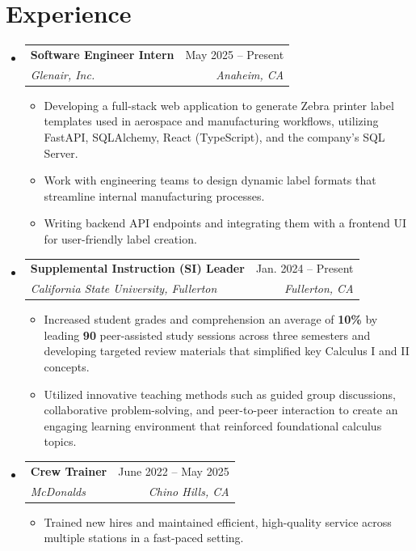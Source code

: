 \documentclass[letterpaper,11pt]{article}
\makeatletter
\newcommand{\resumeItem}[1]{
  \item\small{
    {#1 \vspace{-2pt}}
  }
}
\newcommand{\resumeSubheading}[4]{
  \vspace{-2pt}\item
    \begin{tabular*}{0.97\textwidth}[t]{l@{\extracolsep{\fill}}r}
      \textbf{#1} & #2 \\
      \textit{\small#3} & \textit{\small #4} \\
    \end{tabular*}\vspace{-7pt}
}
\newcommand{\resumeSubSubheading}[2]{
    \item
    \begin{tabular*}{0.97\textwidth}{l@{\extracolsep{\fill}}r}
      \textit{\small#1} & \textit{\small #2} \\
    \end{tabular*}\vspace{-7pt}
}
\newcommand{\resumeSubHeadingListStart}{\begin{itemize}[leftmargin=0.15in, label={}]}
\newcommand{\resumeSubHeadingListEnd}{\end{itemize}}
\newcommand{\resumeItemListStart}{\begin{itemize}}
\newcommand{\resumeItemListEnd}{\end{itemize}\vspace{-5pt}}
\makeatother
\begin{document}
\section{Experience}
  \resumeSubHeadingListStart
    \resumeSubheading
      {Software Engineer Intern}{May 2025 -- Present}
      {Glenair, Inc.}{Anaheim, CA}
      \resumeItemListStart
        \resumeItem{Developing a full-stack web application to generate Zebra printer label templates used in aerospace and manufacturing workflows, utilizing FastAPI, SQLAlchemy, React (TypeScript), and the company’s SQL Server.}
        \resumeItem{Work with engineering teams to design dynamic label formats that streamline internal manufacturing processes.}
        \resumeItem{Writing backend API endpoints and integrating them with a frontend UI for user-friendly label creation.}
      \resumeItemListEnd
      

    \resumeSubheading
      {Supplemental Instruction (SI) Leader}{Jan. 2024 -- Present}
      {California State University, Fullerton}{Fullerton, CA}
      \resumeItemListStart
        \resumeItem{Increased student grades and comprehension an average of \textbf{10\%} by leading \textbf{90} peer-assisted study sessions across three semesters and developing targeted review materials that simplified key Calculus I and II concepts.}
        \resumeItem{Utilized innovative teaching methods such as guided group discussions, collaborative problem-solving, and peer-to-peer interaction to create an engaging learning environment that reinforced foundational calculus topics.}
    \resumeItemListEnd

    \resumeSubheading
      {Crew Trainer}{June 2022 -- May 2025}
      {McDonalds}{Chino Hills, CA}
      \resumeItemListStart
        \resumeItem{Trained new hires and maintained efficient, high-quality service across multiple stations in a fast-paced setting.}
    \resumeItemListEnd


  \resumeSubHeadingListEnd


\end{document}
